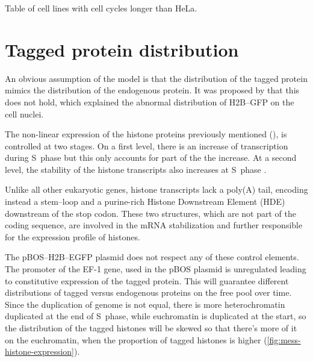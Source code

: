     \begin{table}
      \caption{Table of cell lines with cell cycles longer than HeLa.}
      \label{tab:alternative-cells}
    \end{table}


\section{Tagged protein distribution}
  An obvious assumption of the model is that the distribution of the tagged protein mimics
  the distribution of the endogenous protein. It was proposed by  that
  this does not hold, which explained the abnormal distribution of H2B--GFP on the cell nuclei.

  The non-linear expression of the histone proteins previously mentioned (),
  is controlled at two stages. On a first level, there is an increase of transcription during S~phase
  but this only accounts for part of the the increase. At a second level, the stability of the histone
  transcripts also increases at S~phase .
  
  Unlike all other eukaryotic genes, histone transcripts lack a poly(A) tail, encoding instead a
  stem--loop and a purine-rich Histone Downstream Element (HDE) downstream of the stop codon.
  These two structures, which are not part of the coding sequence, are involved in the
  mRNA stabilization and further responsible for the expression profile of histones.
  
  The pBOS--H2B--EGFP plasmid does not respect any of these control elements. The promoter of the EF-1\textalpha{} gene, used in the
  pBOS plasmid is unregulated leading to constitutive expression of the tagged protein. This will guarantee different
  distributions of tagged versus endogenous proteins on the free pool over time. Since the duplication
  of genome is not equal, there is more heterochromatin duplicated at the end of S~phase, while
  euchromatin is duplicated at the start, so the distribution of the tagged histones will be skewed so that there's
  more of it on the euchromatin, when the proportion of tagged histones is
  higher (\ref{fig:mess-histone-expression}).
  

